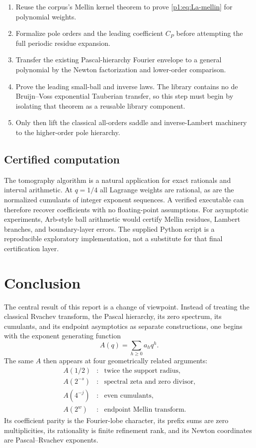 \documentclass[11pt,oneside]{article}
\numberwithin{equation}{section}
\theoremstyle{definition}
\theoremstyle{remark}
\begin{document}
\begin{enumerate}
\item Reuse the corpus's Mellin kernel theorem to prove \eqref{p1:eq:La-mellin} for polynomial
      weights.
\item Formalize pole orders and the leading coefficient $C_P$ before attempting the full
      periodic residue expansion.
\item Transfer the existing Pascal-hierarchy Fourier envelope to a general polynomial by
      the Newton factorization and lower-order comparison.
\item Prove the leading small-ball and inverse laws.  The library contains no de
      Bruijn--Voss exponential Tauberian transfer, so this step must begin by isolating that
      theorem as a reusable library component.
\item Only then lift the classical all-orders saddle and inverse-Lambert machinery to the
      higher-order pole hierarchy.
\end{enumerate}

\subsection{Certified computation}

The tomography algorithm is a natural application for exact rationals and interval
arithmetic.  At $q=1/4$ all Lagrange weights are rational, as are the normalized cumulants of
integer exponent sequences.  A verified executable can therefore recover coefficients with
no floating-point assumptions.  For asymptotic experiments, Arb-style ball arithmetic would
certify Mellin residues, Lambert branches, and boundary-layer errors.  The supplied Python
script is a reproducible exploratory implementation, not a substitute for that final
certification layer.


\section{Conclusion}
\label{p1:sec:conclusion}

The central result of this report is a change of viewpoint.  Instead of treating the
classical Rvachev transform, the Pascal hierarchy, its zero spectrum, its cumulants, and its
endpoint asymptotics as separate constructions, one begins with the exponent generating
function
\[
 A(q)=\sum_{h\ge0}a_hq^h.
\]
The same $A$ then appears at four geometrically related arguments:
\begin{equation}
 \begin{array}{ccl}
 A(1/2) &:& \text{twice the support radius},\\
 A(2^{-s}) &:& \text{spectral zeta and zero divisor},\\
 A(4^{-j}) &:& \text{even cumulants},\\
 A(2^w) &:& \text{endpoint Mellin transform}.
 \end{array}
 \label{p1:eq:four-samples-summary}
\end{equation}
Its coefficient parity is the Fourier-lobe character, its prefix sums are zero
multiplicities, its rationality is finite refinement rank, and its Newton coordinates are
Pascal--Rvachev exponents.
\end{document}
